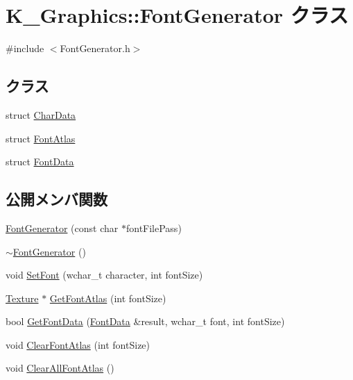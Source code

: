 \hypertarget{class_k___graphics_1_1_font_generator}{}\section{K\+\_\+\+Graphics\+:\+:Font\+Generator クラス}
\label{class_k___graphics_1_1_font_generator}


{\ttfamily \#include $<$Font\+Generator.\+h$>$}

\subsection*{クラス}
\begin{DoxyCompactItemize}
\item 
struct \mbox{\hyperlink{struct_k___graphics_1_1_font_generator_1_1_char_data}{Char\+Data}}
\item 
struct \mbox{\hyperlink{struct_k___graphics_1_1_font_generator_1_1_font_atlas}{Font\+Atlas}}
\item 
struct \mbox{\hyperlink{struct_k___graphics_1_1_font_generator_1_1_font_data}{Font\+Data}}
\end{DoxyCompactItemize}
\subsection*{公開メンバ関数}
\begin{DoxyCompactItemize}
\item 
\mbox{\hyperlink{class_k___graphics_1_1_font_generator_a832617f2e9d50a7c6c613fa701665901}{Font\+Generator}} (const char $\ast$font\+File\+Pass)
\item 
\mbox{\hyperlink{class_k___graphics_1_1_font_generator_ab79beb1d0cf1780577d5ea16c8d89d67}{$\sim$\+Font\+Generator}} ()
\item 
void \mbox{\hyperlink{class_k___graphics_1_1_font_generator_a012e42323f6a295173f63e9acfc82dfc}{Set\+Font}} (wchar\+\_\+t character, int font\+Size)
\item 
\mbox{\hyperlink{class_k___graphics_1_1_texture}{Texture}} $\ast$ \mbox{\hyperlink{class_k___graphics_1_1_font_generator_a2b5d1ab68fcf0ffe83c65f4c694628bc}{Get\+Font\+Atlas}} (int font\+Size)
\item 
bool \mbox{\hyperlink{class_k___graphics_1_1_font_generator_ae6260c5ee857b4b95dc341d2160b1d6d}{Get\+Font\+Data}} (\mbox{\hyperlink{struct_k___graphics_1_1_font_generator_1_1_font_data}{Font\+Data}} \&result, wchar\+\_\+t font, int font\+Size)
\item 
void \mbox{\hyperlink{class_k___graphics_1_1_font_generator_ae84e22ce5a6e38d03f77f8a3b9393012}{Clear\+Font\+Atlas}} (int font\+Size)
\item 
void \mbox{\hyperlink{class_k___graphics_1_1_font_generator_a2e90321835a229436d378647aaddcab5}{Clear\+All\+Font\+Atlas}} ()
\end{DoxyCompactItemize}


